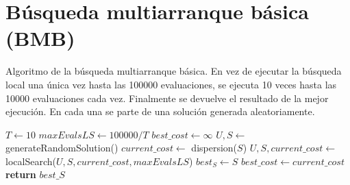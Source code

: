 \section{Búsqueda multiarranque básica (BMB)}
\begin{algorithm}[H]
\caption{Algoritmo de la búsqueda multiarranque básica. En vez de ejecutar la búsqueda local una única vez hasta las 100000 evaluaciones, se ejecuta 10 veces hasta las 10000 evaluaciones cada vez. Finalmente se devuelve el resultado de la mejor ejecución. En cada una se parte de una solución generada aleatoriamente.}
\begin{algorithmic}[1]
        \State $T \leftarrow 10$
        \State $maxEvalsLS \leftarrow 100000/T$
        \State
        \State $best\_cost \leftarrow \infty$
            \State $U, S \leftarrow$ generateRandomSolution()
            \State
            \State $current\_cost \leftarrow$ dispersion($S$)
            \State $U, S, current\_cost \leftarrow$ localSearch($U, S, current\_cost, maxEvalsLS$)
            \State
                \State $best_S \leftarrow S$
                \State $best\_cost \leftarrow current\_cost$
            \EndIf
        \EndFor
        \State
        \State \textbf{return} $best\_S$  
    \EndProcedure
\end{algorithmic}
\end{algorithm}

\newpage
